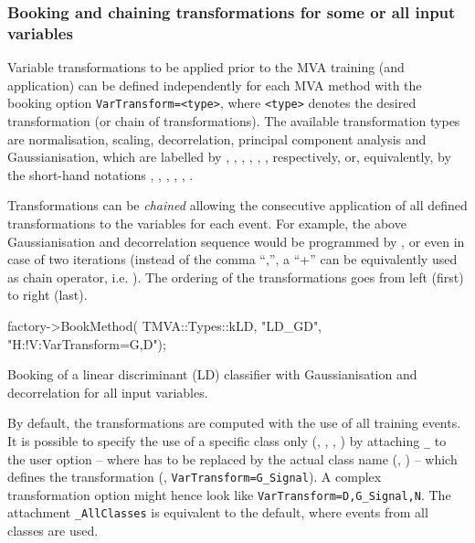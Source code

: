 \subsubsection{Booking and chaining transformations for some or all input variables}

Variable transformations to be applied prior to the MVA training (and application) 
can be defined independently for each MVA method with the booking option 
{\tt VarTransform=<type>}, where {\tt <type>} denotes the desired transformation 
(or chain of transformations). The available transformation types are normalisation, scaling, 
decorrelation, principal component analysis and Gaussianisation, which are labelled by 
, , , , , , respectively, or, equivalently, 
by the short-hand notations , , , ,  , .

Transformations can be {\em chained} allowing the consecutive application of all defined 
transformations to the variables for each event.
For example, the above Gaussianisation and decorrelation sequence would be programmed by 
, or even  in case of two iterations 
(instead of the comma ``,'', a ``+'' can be equivalently used as chain operator, 
i.e. ). The ordering of the transformations goes from 
left (first) to right (last). 

\begin{codeexample}
\begin{tmvacode}
factory->BookMethod( TMVA::Types::kLD, "LD_GD", "H:!V:VarTransform=G,D");
\end{tmvacode}
\caption[.]{\codeexampleCaptionSize Booking of a linear discriminant
  (LD) classifier with Gaussianisation and decorrelation for all input
  variables.  }
\end{codeexample}

By default, the transformations are computed with the use of all training events. It is 
possible to specify the use of a specific class only (\eg, , , 
) by attaching {\tt \_<class name>} to the user option -- 
where {\tt <class name>} has to be replaced by the actual class name 
(\eg, ) -- which defines the transformation (\eg, {\tt VarTransform=G\_Signal}). 
A complex transformation option might hence look like {\tt VarTransform=D,G\_Signal,N}.
The attachment {\tt \_AllClasses} is equivalent to the default, where events from all 
classes are used.

